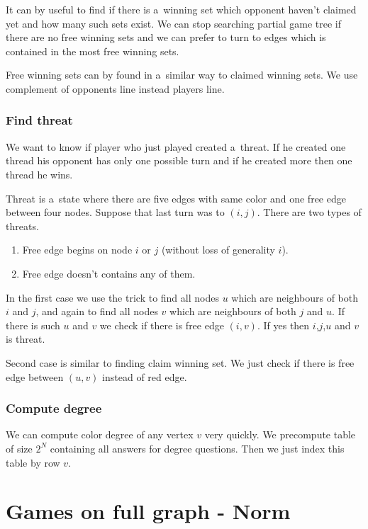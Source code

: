 It can by useful to find if there is a~winning set which opponent haven't
claimed yet and how many such sets exist. We can stop searching partial game tree if
there are no free winning sets and we can prefer to turn to edges which is
contained in the most free winning sets.

Free winning sets can by found in a~similar way to claimed winning sets. We use
complement of opponents line instead players line.

\subsubsection{ Find threat }

We want to know if player who just played created a~threat. If he created one
thread his opponent has only one possible turn and if he created more then one
thread he wins. 

Threat is a~state where there are five edges with same color and one free edge
between four nodes. Suppose that last turn was to $(i,j)$. There are two
types of threats.
 
\begin{enumerate} 
	\item Free edge begins on node $i$ or $j$ (without loss of generality $i$). 
	\item Free edge doesn't contains any of them.  
\end{enumerate}

In the first case we use the trick to find all nodes $u$ which are neighbours of both
$i$ and $j$, and again to find all nodes $v$ which are neighbours of
both $j$ and $u$. If there is such $u$ and $v$ we check if there is free edge
$(i,v)$. If yes then $i$,$j$,$u$ and $v$ is threat.  

Second case is similar to finding claim winning set. We just check if there is free
edge between $(u,v)$ instead of red edge.  

\subsubsection{ Compute degree }

We can compute color degree of any vertex $v$ very quickly. We precompute table of size
$2^N$ containing all answers for degree questions. Then we just index this table by
row $v$. 

\section{ Games on full graph - Norm } \label{norm} 

